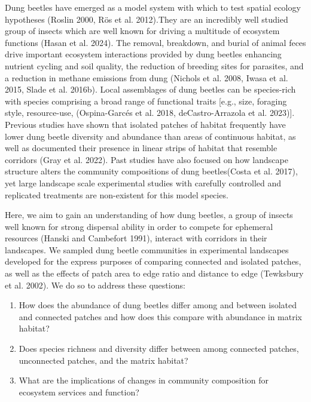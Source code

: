 \documentclass[
  man, donotrepeattitle]{apa6}
\providecommand{\tightlist}{%
  \setlength{\itemsep}{0pt}\setlength{\parskip}{0pt}}
\begin{document}
Dung beetles have emerged as a model system with which to test spatial ecology hypotheses (Roslin 2000, Rös et al. 2012).They are an incredibly well studied group of insects which are well known for driving a multitude of ecosystem functions (Hasan et al. 2024). The removal, breakdown, and burial of animal feces drive important ecosystem interactions provided by dung beetles enhancing nutrient cycling and soil quality, the reduction of breeding sites for parasites, and a reduction in methane emissions from dung (Nichols et al. 2008, Iwasa et al. 2015, Slade et al. 2016b). Local assemblages of dung beetles can be species-rich with species comprising a broad range of functional traits {[}e.g., size, foraging style, resource-use, (Ospina-Garcés et al. 2018, deCastro-Arrazola et al. 2023){]}. Previous studies have shown that isolated patches of habitat frequently have lower dung beetle diversity and abundance than areas of continuous habitat, as well as documented their presence in linear strips of habitat that resemble corridors (Gray et al. 2022). Past studies have also focused on how landscape structure alters the community compositions of dung beetles(Costa et al. 2017), yet large landscape scale experimental studies with carefully controlled and replicated treatments are non-existent for this model species.

Here, we aim to gain an understanding of how dung beetles, a group of insects well known for strong dispersal ability in order to compete for ephemeral resources (Hanski and Cambefort 1991), interact with corridors in their landscapes. We sampled dung beetle communities in experimental landscapes developed for the express purposes of comparing connected and isolated patches, as well as the effects of patch area to edge ratio and distance to edge (Tewksbury et al. 2002). We do so to address these questions:

\begin{enumerate}
\def\labelenumi{(\arabic{enumi})}
\tightlist
\item
  How does the abundance of dung beetles differ among and between isolated and connected patches and how does this compare with abundance in matrix habitat?
\item
  Does species richness and diversity differ between among connected patches, unconnected patches, and the matrix habitat?
\item
  What are the implications of changes in community composition for ecosystem services and function?
\end{enumerate}
\end{document}
